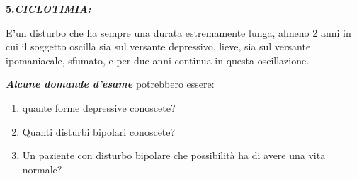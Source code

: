 \documentclass[]{article}
\begin{document}
\textbf{5.\emph{CICLOTIMIA:}}

E\textbf{'}un disturbo che ha sempre una durata estremamente lunga,
almeno 2 anni in cui il soggetto oscilla sia sul versante depressivo,
lieve, sia sul versante ipomaniacale, sfumato, e per due anni continua
in questa oscillazione.

\emph{\textbf{Alcune domande d'esame}} potrebbero essere:

\begin{enumerate}
\def\labelenumi{\arabic{enumi}.}
\item
  quante forme depressive conoscete?
\item
  Quanti disturbi bipolari conoscete?
\item
  Un paziente con disturbo bipolare che possibilità ha di avere una vita
  normale?
\end{enumerate}
\end{document}
